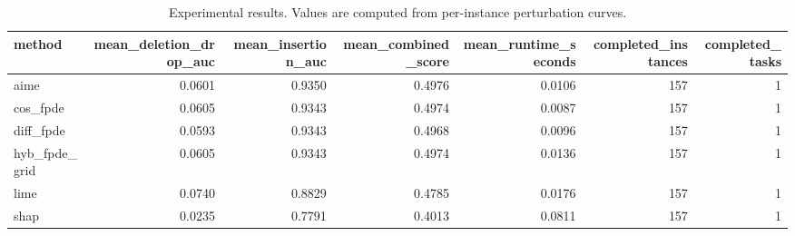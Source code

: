 \begin{table}[t]
\caption{Experimental results. Values are computed from per-instance perturbation curves.}
\label{tab:main_results_computed}
\centering
\begin{tabular}{lrrrrrr}
\toprule
method & mean\_deletion\_drop\_auc & mean\_insertion\_auc & mean\_combined\_score & mean\_runtime\_seconds & completed\_instances & completed\_tasks \\
\midrule
aime & 0.0601 & 0.9350 & 0.4976 & 0.0106 & 157 & 1 \\
cos\_fpde & 0.0605 & 0.9343 & 0.4974 & 0.0087 & 157 & 1 \\
diff\_fpde & 0.0593 & 0.9343 & 0.4968 & 0.0096 & 157 & 1 \\
hyb\_fpde\_grid & 0.0605 & 0.9343 & 0.4974 & 0.0136 & 157 & 1 \\
lime & 0.0740 & 0.8829 & 0.4785 & 0.0176 & 157 & 1 \\
shap & 0.0235 & 0.7791 & 0.4013 & 0.0811 & 157 & 1 \\
\bottomrule
\end{tabular}

\end{table}
